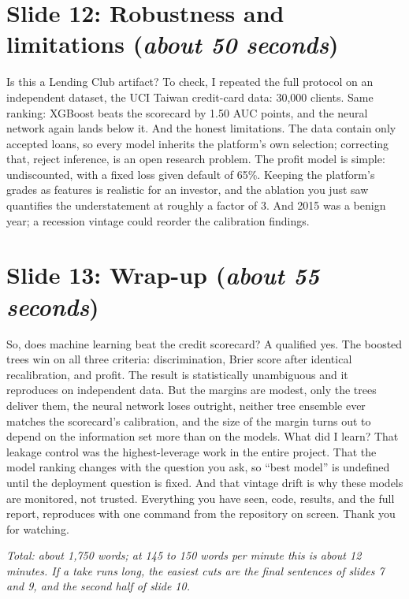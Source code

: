 \documentclass[a4paper,11pt]{article}
\newcommand{\slideblock}[3]{%
  \section*{Slide #1: #2 \hfill \normalfont\small(\textit{#3})}}
\begin{document}
\slideblock{12}{Robustness and limitations}{about 50 seconds}
Is this a Lending Club artifact? To check, I repeated the full protocol on an independent dataset, the UCI Taiwan credit-card data: 30,000 clients. Same ranking: XGBoost beats the scorecard by 1.50 AUC points, and the neural network again lands below it. And the honest limitations. The data contain only accepted loans, so every model inherits the platform's own selection; correcting that, reject inference, is an open research problem. The profit model is simple: undiscounted, with a fixed loss given default of 65\%. Keeping the platform's grades as features is realistic for an investor, and the ablation you just saw quantifies the understatement at roughly a factor of 3. And 2015 was a benign year; a recession vintage could reorder the calibration findings.

\slideblock{13}{Wrap-up}{about 55 seconds}
So, does machine learning beat the credit scorecard? A qualified yes. The boosted trees win on all three criteria: discrimination, Brier score after identical recalibration, and profit. The result is statistically unambiguous and it reproduces on independent data. But the margins are modest, only the trees deliver them, the neural network loses outright, neither tree ensemble ever matches the scorecard's calibration, and the size of the margin turns out to depend on the information set more than on the models. What did I learn? That leakage control was the highest-leverage work in the entire project. That the model ranking changes with the question you ask, so ``best model'' is undefined until the deployment question is fixed. And that vintage drift is why these models are monitored, not trusted. Everything you have seen, code, results, and the full report, reproduces with one command from the repository on screen. Thank you for watching.

\vspace{6mm}
\noindent\textit{Total: about 1,750 words; at 145 to 150 words per minute this is about 12 minutes. If a take runs long, the easiest cuts are the final sentences of slides 7 and 9, and the second half of slide 10.}
\end{document}
